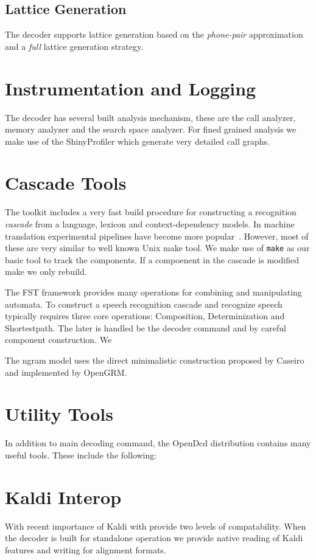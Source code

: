 \documentclass{article}
\begin{document}
\subsection{Lattice Generation}
The decoder supports lattice generation based on the \emph{phone-pair}
approximation and a \emph{full} lattice generation strategy.

\section{Instrumentation and Logging}
\label{sec:instrumentation}
The decoder has several built analysis mechanism, these are the call analyzer,
memory analyzer and the search space analyzer. For fined grained analysis we 
make use of the ShinyProfiler which generate very detailed call graphs.

\section{Cascade Tools}
\label{sec:cascade}
The toolkit includes a very fast build procedure for constructing a recognition
\emph{cascade} from a language, lexicon and context-dependency models. In 
machine translation experimental pipelines have become more popular~\cite{koehn10}. 
However, most of these are very similar to well known Unix make tool. We make 
use of \texttt{make} as our basic tool to track the components. 
If a compoenent in the cascade is modified make we only rebuild.

The FST framework provides many operations for combining and manipulating
automata. To construct a speech recognition cascade and recognize speech 
typically requires three core operations: Composition, Determinization and
Shortestpath. The later is handled be the decoder command and by careful
component construction. We 

The ngram model uses the direct minimalistic construction proposed by
Caseiro~\cite{caseiro01} and implemented by OpenGRM.

\section{Utility Tools}
\label{sec:postprocess}
In addition to main decoding command, the OpenDcd distribution contains
many useful tools. These include the following:


\section{Kaldi Interop}
With recent importance of Kaldi with provide two levels of compatability.
When the decoder is built for standalone operation we provide native reading
of Kaldi features and writing for alignment formats.
\end{document}
